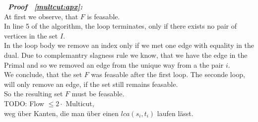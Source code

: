 \begin{description}
   \item{\bfseries\itshape~Proof ~\ref{multcut:apx}:}\\
      At first we observe, that $F$ is feasable.\\
      In line 5 of the algorithm, the loop terminates, only
      if there exists no pair of vertices in the set $I$.\\
      In the loop body we remove an index only if we met one
      edge with equality in the dual. Due to complemantry slagness rule
      we know, that we have the edge in the Primal and so we removed an
      edge from the unique way from a the pair $i$.\\
      We conclude, that the set $F$ was feasable after the first loop.
      The seconde loop, will only remove an edge, if the set still remains feasable.\\
      So the resulting set $F$ must be feasable.\\

     TODO: Flow $\leq 2 \cdot$ Multicut,\\
          weg über Kanten, die man über einen $lca(s_i,t_i)$ laufen lässt.
\end{description}
